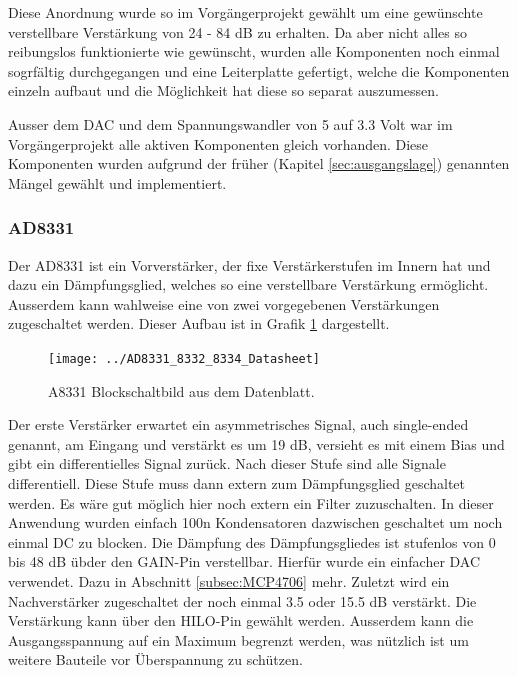 Diese Anordnung wurde so im Vorgängerprojekt gewählt um eine gewünschte verstellbare Verstärkung von 24 - 84 dB zu erhalten.
Da aber nicht alles so reibungslos funktionierte wie gewünscht, wurden alle Komponenten noch einmal sogrfältig durchgegangen und eine Leiterplatte gefertigt, welche die Komponenten einzeln aufbaut und die Möglichkeit hat diese so separat auszumessen.

Ausser dem DAC und dem Spannungswandler von 5 auf 3.3 Volt war im Vorgängerprojekt alle aktiven Komponenten gleich vorhanden. Diese Komponenten wurden aufgrund der früher (Kapitel \ref{sec:ausgangslage}) genannten Mängel gewählt und implementiert.

\subsubsection{AD8331}

Der AD8331\cite{AD8331} ist ein Vorverstärker, der fixe Verstärkerstufen im Innern hat und dazu ein Dämpfungsglied, welches so eine verstellbare Verstärkung ermöglicht. Ausserdem kann wahlweise eine von zwei vorgegebenen Verstärkungen zugeschaltet werden. Dieser Aufbau ist in Grafik \ref{fig:AD8331} dargestellt.

\begin{figure}[H]
\begin{center}
    \texttt{[image: ../AD8331\_8332\_8334\_Datasheet]}
    \caption{A8331 Blockschaltbild aus dem Datenblatt\cite{AD8331}.}
    \label{fig:AD8331}
\end{center}
\end{figure}

Der erste Verstärker erwartet ein asymmetrisches Signal, auch single-ended genannt, am Eingang und verstärkt es um 19 dB, versieht es mit einem Bias und gibt ein differentielles Signal zurück. Nach dieser Stufe sind alle Signale differentiell.
Diese Stufe muss dann extern zum Dämpfungsglied geschaltet werden. Es wäre gut möglich hier noch extern ein Filter zuzuschalten. In dieser Anwendung wurden einfach 100n Kondensatoren dazwischen geschaltet um noch einmal DC zu blocken. %
Die Dämpfung des Dämpfungsgliedes ist stufenlos von 0 bis 48 dB übder den GAIN-Pin verstellbar. Hierfür wurde ein einfacher DAC verwendet. Dazu in Abschnitt \ref{subsec:MCP4706} mehr.
Zuletzt wird ein Nachverstärker zugeschaltet der noch einmal 3.5 oder 15.5 dB verstärkt. Die Verstärkung kann über den HILO-Pin gewählt werden.
Ausserdem kann die Ausgangsspannung auf ein Maximum begrenzt werden, was nützlich ist um weitere Bauteile vor Überspannung zu schützen.

